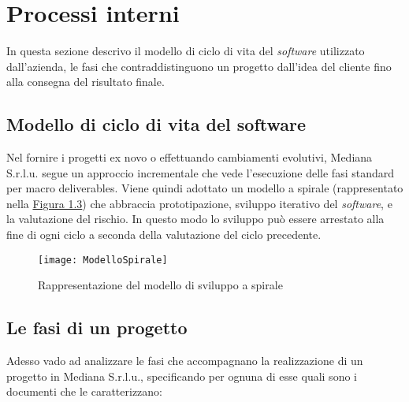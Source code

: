 \section{Processi interni}
\label{processi}

In questa sezione descrivo il modello di ciclo di vita del \textit{software} utilizzato dall'azienda, le fasi che contraddistinguono un progetto dall'idea del cliente fino alla consegna del risultato finale. 

\subsection{Modello di ciclo di vita del software}
\label{ciclo di vita}
Nel fornire i progetti ex novo o effettuando cambiamenti evolutivi, Mediana S.r.l.u. segue un approccio incrementale che vede l'esecuzione delle fasi standard per macro \glspl{deliverable}. Viene quindi adottato un modello a spirale (rappresentato nella \hyperref[spirale]{Figura 1.3}) che abbraccia prototipazione, sviluppo iterativo del \textit{software}, e la valutazione del rischio. In questo modo lo sviluppo può essere arrestato alla fine di ogni ciclo a seconda della valutazione del ciclo precedente.

\begin{figure}[ht]
\begin{center}
\texttt{[image: ModelloSpirale]}
\caption{Rappresentazione del modello di sviluppo a spirale}
\label{spirale}
\end{center}
\end{figure}
\FloatBarrier

\subsection{Le fasi di un progetto}
\label{fasi progetto}
Adesso vado ad analizzare le fasi che accompagnano la realizzazione di un progetto in Mediana S.r.l.u., specificando per ognuna di esse quali sono i documenti che le caratterizzano:

